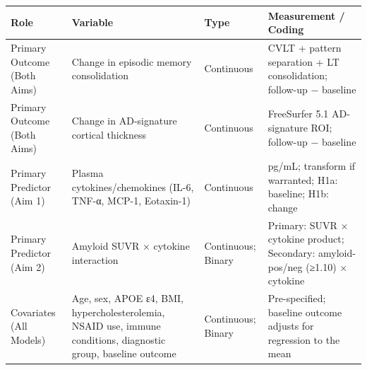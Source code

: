 \documentclass[
]{article}
\begin{document}
\begin{longtable}[]{@{}
  >{\raggedright\arraybackslash}p{}
  >{\raggedright\arraybackslash}p{}
  >{\raggedright\arraybackslash}p{}
  >{\raggedright\arraybackslash}p{}@{}}
\toprule\noalign{}
\begin{minipage}[b]{\linewidth}\raggedright
Role
\end{minipage} & \begin{minipage}[b]{\linewidth}\raggedright
Variable
\end{minipage} & \begin{minipage}[b]{\linewidth}\raggedright
Type
\end{minipage} & \begin{minipage}[b]{\linewidth}\raggedright
Measurement / Coding
\end{minipage} \\
\midrule\noalign{}
\endhead
\bottomrule\noalign{}
\endlastfoot
Primary Outcome (Both Aims) & Change in episodic memory consolidation &
Continuous & CVLT + pattern separation + LT consolidation; follow-up −
baseline \\
Primary Outcome (Both Aims) & Change in AD-signature cortical thickness
& Continuous & FreeSurfer 5.1 AD-signature ROI; follow-up − baseline \\
Primary Predictor (Aim 1) & Plasma cytokines/chemokines (IL-6, TNF-α,
MCP-1, Eotaxin-1) & Continuous & pg/mL; transform if warranted; H1a:
baseline; H1b: change \\
Primary Predictor (Aim 2) & Amyloid SUVR × cytokine interaction &
Continuous; Binary & Primary: SUVR × cytokine product; Secondary:
amyloid-pos/neg (≥1.10) × cytokine \\
Covariates (All Models) & Age, sex, APOE ε4, BMI, hypercholesterolemia,
NSAID use, immune conditions, diagnostic group, baseline outcome &
Continuous; Binary & Pre-specified; baseline outcome adjusts for
regression to the mean \\
\end{longtable}
\end{document}
